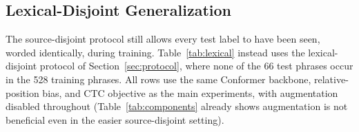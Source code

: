 \documentclass[runningheads]{llncs}
\begin{document}
\subsection{Lexical-Disjoint Generalization}
\label{sec:lexical}
The source-disjoint protocol still allows every test label to have been seen, worded identically, during training. Table~\ref{tab:lexical} instead uses the lexical-disjoint protocol of Section~\ref{sec:protocol}, where none of the 66 test phrases occur in the 528 training phrases. All rows use the same Conformer backbone, relative-position bias, and CTC objective as the main experiments, with augmentation disabled throughout (Table~\ref{tab:components} already shows augmentation is not beneficial even in the easier source-disjoint setting).

\begin{table}[htbp]
\centering
\caption{Lexical-disjoint open-phrase recognition (66 unseen test phrases). All rows disable augmentation, relative-position Conformer; D+F rows use dynamics+Fourier concatenation, batch size 256. ``Full model, control'' applies the same dropout to the default S+D+F gated architecture instead of removing the spatial branch.}
\label{tab:lexical}
\end{table}
\end{document}
